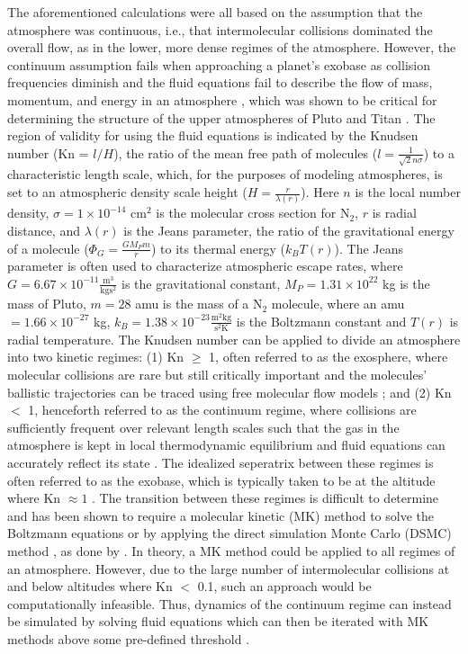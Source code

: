 \documentclass[times,12]{article}
\begin{document}
\indent The aforementioned calculations were all based on the assumption that the atmosphere was continuous, i.e., that intermolecular collisions dominated the overall flow, as in the lower, more dense regimes of the atmosphere. However, the continuum assumption fails when approaching a planet's exobase as collision frequencies diminish and the fluid equations fail to describe the flow of mass, momentum, and energy in an atmosphere \citep{Johnson2010, Volkov2011, Erwin2013}, which was shown to be critical for determining the structure of the upper atmospheres of Pluto and Titan \citep{Tucker2009, Tucker2012}. The region of validity for using the fluid equations is indicated by the Knudsen number (Kn = $l/H$), the ratio of the mean free path of molecules ($l = \frac{1}{\sqrt{2} n \sigma}$) to a characteristic length scale, which, for the purposes of modeling atmospheres, is set to an atmospheric density scale height ($H = \frac{r}{\lambda(r)}$). Here $n$ is the local number density, $\sigma = 1\times 10^{-14}$ cm$^{2}$ is the molecular cross section for N$_2$, $r$ is radial distance, and $\lambda(r)$ is the Jeans parameter, the ratio of the gravitational energy of a molecule ($\Phi_G = \frac{G M_P m}{r}$) to its thermal energy ($k_B T(r)$). The Jeans parameter is often used to characterize atmospheric escape rates, where $G = 6.67 \times 10^{-11} \frac{\mathrm{m^3}}{\mathrm{kg s^2}}$ is the gravitational constant, $M_P = 1.31 \times 10^{22}$ kg is the mass of Pluto,  $m = 28$ amu is the mass of a N$_2$ molecule, where an amu $=1.66 \times 10^{-27}$ kg, $k_B=1.38 \times 10^{-23} \frac{\mathrm{m^2 kg}}{\mathrm{s^2 K}}$ is the Boltzmann constant and $T(r)$ is radial temperature. The Knudsen number can be applied to divide an atmosphere into two kinetic regimes: (1) Kn $\geq$ 1, often referred to as the exosphere, where molecular collisions are rare but still critically important \citep{Marconi1996} and the molecules' ballistic trajectories can be traced using free molecular flow models \citep{Tucker2015}; and (2) Kn $<$ 1, henceforth referred to as the continuum regime, where collisions are sufficiently frequent over relevant length scales such that the gas in the atmosphere is kept in local thermodynamic equilibrium and fluid equations can accurately reflect its state \citep{Marconi1996, Erwin2013}. The idealized seperatrix between these regimes is often referred to as the exobase, which is typically taken to be at the altitude where Kn $\approx 1$ \citep{Tucker2012}. The transition between these regimes is difficult to determine and has been shown to require a molecular kinetic (MK) method to solve the Boltzmann equations \citep{Marconi1996} or by applying the direct simulation Monte Carlo (DSMC) method \citep{Bird1994}, as done by \cite{Tucker2009, Volkov2011, Volkov2011a, Tucker2012, Erwin2013, Tucker2015, Hoey2017a}. In theory, a MK method could be applied to all regimes of an atmosphere. However, due to the large number of intermolecular collisions at and below altitudes where Kn $<$ 0.1, such an approach would be computationally infeasible. Thus, dynamics of the continuum regime can instead be simulated by solving fluid equations which can then be iterated with MK methods above some pre-defined threshold \citep{Marconi1996, Tucker2012, Erwin2013}.\\
\end{document}
